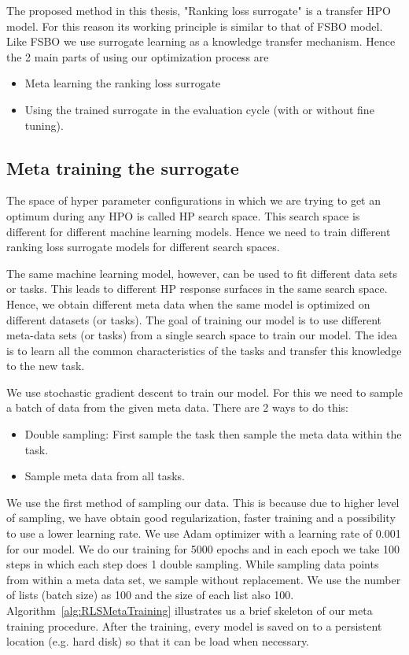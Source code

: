 \documentclass[12pt, twoside, ngerman]{report}
\begin{document}
The proposed method in this thesis, "Ranking loss surrogate" is a transfer HPO model.
For this reason its working principle is similar to that of FSBO model.
Like FSBO we use surrogate learning as a knowledge transfer mechanism.
Hence the 2 main parts of using our optimization process are
\begin{itemize}
\item Meta learning the ranking loss surrogate
\item Using the trained surrogate in the evaluation cycle (with or without fine tuning).
\end{itemize}

\subsection{Meta training the surrogate}\label{sec:rlmetatraining}

The space of hyper parameter configurations in which we are trying to get an optimum during any HPO is called HP search space.
This search space is different for different machine learning models.
Hence we need to train different ranking loss surrogate models for different search spaces.

The same machine learning model,  however,  can be used to fit different data sets or tasks.
This leads to different HP response surfaces in the same search space.
Hence,  we obtain different meta data when the same model is optimized on different datasets (or tasks).
The goal of training our model is to use different meta-data sets (or tasks) from a single search space to train our model.
The idea is to learn all the common characteristics of the tasks and transfer this knowledge to the new task.

We use stochastic gradient descent to train our model.
For this we need to sample a batch of data from the given meta data.
There are 2 ways to do this:
\begin{itemize}
\item Double sampling: First sample the task then sample the meta data within the task.
\item Sample meta data from all tasks.
\end{itemize}

We use the first method of sampling our data.
This is because due to higher level of sampling,  we have obtain good regularization,
faster training and a possibility to use a lower learning rate.
We use Adam optimizer with a learning rate of 0.001 for our model.
We do our training for 5000 epochs and in each epoch we take 100 steps in which each step does 1 double sampling.
While sampling data points from within a meta data set, we sample without replacement.
We use the number of lists (batch size) as 100 and the size of each list also 100.
Algorithm~\ref{alg:RLSMetaTraining} illustrates us a brief skeleton of our meta training procedure.
After the training,  every model is saved on to a persistent location (e.g. hard disk) so that it can be load when necessary.
\end{document}

